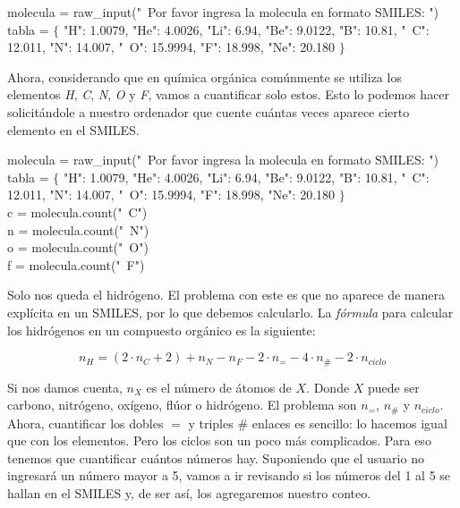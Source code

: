 \documentclass[10pt,letterpaper]{article}
\newenvironment{Code}
{
\begin{lrbox}{\selvestebox}%
\begin{minipage}{\dimexpr\columnwidth-2\fboxsep\relax}
\fontfamily{\ttdefault}\selectfont
}
{\end{minipage}\end{lrbox}%
\begin{center}
\colorbox{light-gray}{\usebox{\selvestebox}}
\end{center}
}
\begin{document}
\begin{Code}
molecula = raw\_input("\ \hspace{-2mm}Por favor ingresa la molecula en formato SMILES: ")\\
tabla = $\lbrace$ "H": 1.0079, "He": 4.0026, "Li": 6.94, "Be": 9.0122, "B": 10.81, "\ \hspace{-2mm}C": 12.011, "N": 14.007, "\ \hspace{-2mm}O": 15.9994, "F": 18.998, "Ne": 20.180 $\rbrace$
\end{Code}

\noindent Ahora, considerando que en qu\'imica org\'anica com\'unmente se utiliza los elementos \emph{H}, \emph{C}, \emph{N}, \emph{O} y \emph{F}, vamos a cuantificar solo estos. Esto lo podemos hacer solicit\'andole a nuestro ordenador que cuente cu\'antas veces aparece cierto elemento en el SMILES.

\begin{Code}
molecula = raw\_input("\ \hspace{-2mm}Por favor ingresa la molecula en formato SMILES: ")\\
tabla = $\lbrace$ "H": 1.0079, "He": 4.0026, "Li": 6.94, "Be": 9.0122, "B": 10.81, "\ \hspace{-2mm}C": 12.011, "N": 14.007, "\ \hspace{-2mm}O": 15.9994, "F": 18.998, "Ne": 20.180 $\rbrace$\\
c = molecula.count("\ \hspace{-2mm}C")\\
n = molecula.count("\ \hspace{-2mm}N")\\
o = molecula.count("\ \hspace{-2mm}O")\\
f = molecula.count("\ \hspace{-2mm}F")
\end{Code}

Solo nos queda el hidr\'ogeno. El problema con este es que no aparece de manera expl\'icita en un SMILES, por lo que debemos calcularlo. La \emph{f\'ormula} para calcular los hidr\'ogenos en un compuesto org\'anico es la siguiente:

\begin{equation}
n_H = \left( 2 \cdot n_C + 2 \right) + n_N - n_F - 2 \cdot n_= - 4 \cdot n_\# - 2 \cdot n_{ciclo}
\end{equation}

Si nos damos cuenta, $n_X$ es el n\'umero de \'atomos de $X$. Donde $X$ puede ser carbono, nitr\'ogeno, ox\'igeno, fl\'uor o hidr\'ogeno. El problema son $n_=$, $n_\#$ y $n_{ciclo}$. Ahora, cuantificar los dobles $=$ y triples $\#$ enlaces es sencillo: lo hacemos igual que con los elementos. Pero los ciclos son un poco m\'as complicados. Para eso tenemos que cuantificar cu\'antos n\'umeros hay. Suponiendo que el usuario no ingresar\'a un n\'umero mayor a 5, vamos a ir revisando si los n\'umeros del 1 al 5 se hallan en el SMILES y, de ser as\'i, los agregaremos nuestro conteo.\\
\end{document}
